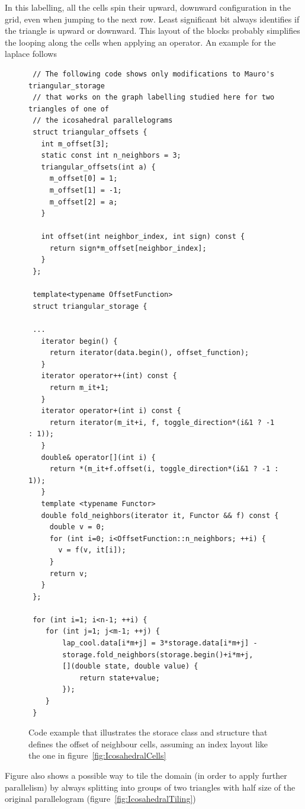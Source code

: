 \documentclass{book}
\begin{document}
In this labelling, all the cells spin their upward, downward configuration in the grid, even when jumping to the next row. 
Least significant bit always identifies if the triangle is upward or downward.  
This layout of the blocks probably simplifies the looping along the cells when applying an operator. An example for the laplace follows
\begin{figure}[htb!]
\begin{verbatim}
 // The following code shows only modifications to Mauro's triangular_storage
 // that works on the graph labelling studied here for two triangles of one of 
 // the icosahedral parallelograms
 struct triangular_offsets {
   int m_offset[3];
   static const int n_neighbors = 3;
   triangular_offsets(int a) {
     m_offset[0] = 1;
     m_offset[1] = -1;
     m_offset[2] = a;
   }
 
   int offset(int neighbor_index, int sign) const {
     return sign*m_offset[neighbor_index];
   }
 };
 
 template<typename OffsetFunction>
 struct triangular_storage {
 
 ...
   iterator begin() {
     return iterator(data.begin(), offset_function);
   }
   iterator operator++(int) const {
     return m_it+1;
   }
   iterator operator+(int i) const {
     return iterator(m_it+i, f, toggle_direction*(i&1 ? -1 : 1));
   }
   double& operator[](int i) {
     return *(m_it+f.offset(i, toggle_direction*(i&1 ? -1 : 1));
   }
   template <typename Functor>
   double fold_neighbors(iterator it, Functor && f) const {
     double v = 0;
     for (int i=0; i<OffsetFunction::n_neighbors; ++i) {
       v = f(v, it[i]);
     }
     return v;
   }
 };
 
 for (int i=1; i<n-1; ++i) {
 	for (int j=1; j<m-1; ++j) {
 		lap_cool.data[i*m+j] = 3*storage.data[i*m+j] -
 		storage.fold_neighbors(storage.begin()+i*m+j,
 		[](double state, double value) {
 			return state+value;
 		});
 	}
 }
\end{verbatim}
	\caption{Code example that illustrates the storace class and structure that defines the offset of neighbour cells, assuming an index layout like the one in figure~\ref{fig:IcosahedralCells} }
	\label{lst:TriangularOffsets}
\end{figure}

Figure also shows a possible way to tile the domain (in order to apply further parallelism) by always splitting into groups of two triangles with half size of the original parallelogram (figure~\ref{fig:IcosahedralTiling})
\end{document}
